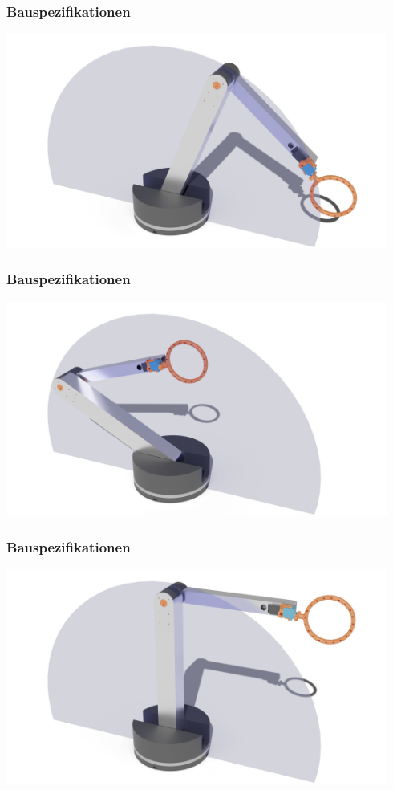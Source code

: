 \documentclass[aspectratio=169]{beamer}
\begin{document}
\begin{frame}[label = ArmPictures]
	\frametitle{Bauspezifikationen}
	\begin{center}
		\includegraphics[height = 200pt]{../resources/ArmOnPlane2}
	\end{center}
\end{frame}

\begin{frame}[label = ArmPictures]
	\frametitle{Bauspezifikationen}
	\begin{center}
		\includegraphics[height = 200pt]{../resources/ArmOnPlane3}
	\end{center}
\end{frame}

\begin{frame}[label = ArmPictures]
	\frametitle{Bauspezifikationen}
	\begin{center}
		\includegraphics[height = 200pt]{../resources/ArmOnPlane1}
	\end{center}
\end{frame}
\end{document}
